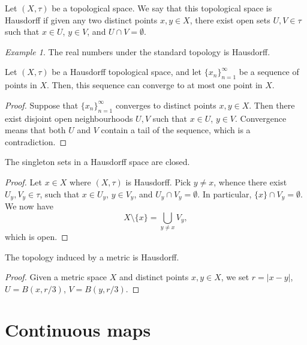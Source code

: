 \documentclass[11pt]{article}
\theoremstyle{definition}
\theoremstyle{remark}
\newtheorem*{example}{Example}
\numberwithin{equation}{section}
\begin{document}
    \begin{definition}
        Let $(X, \tau)$ be a topological space. We say that this topological space is
        Hausdorff if given any two distinct points $x, y \in X$, there exist open
        sets $U, V \in \tau$ such that $x \in U$, $y \in V$, and $U \cap V =
        \emptyset$.
    \end{definition}

    \begin{example}
        The real numbers under the standard topology is Hausdorff.
    \end{example}

    \begin{theorem}
        Let $(X, \tau)$ be a Hausdorff topological space, and let $\{x_n\}_{n =
        1}^\infty$ be a sequence of points in $X$. Then, this sequence can converge
        to at most one point in $X$.
    \end{theorem}
    \begin{proof}
        Suppose that $\{x_n\}_{n = 1}^\infty$ converges to distinct points $x, y \in
        X$. Then there exist disjoint open neighbourhoods $U, V$ such that $x \in U$,
        $y \in V$. Convergence means that both $U$ and $V$ contain a tail of the
        sequence, which is a contradiction.
    \end{proof}

    \begin{lemma}
        The singleton sets in a Hausdorff space are closed.
    \end{lemma}
    \begin{proof}
        Let $x \in X$ where $(X, \tau)$ is Hausdorff. Pick $y \neq x$, whence there
        exist $U_y, V_y \in \tau$, such that $x \in U_y$, $y \in V_y$, and $U_y \cap
        V_y = \emptyset$. In particular, $\{x\} \cap V_y = \emptyset$. We now have \[
            X\setminus \{x\} = \bigcup_{y \neq x} V_y,
        \] which is open.
    \end{proof}

    \begin{theorem}
        The topology induced by a metric is Hausdorff.
    \end{theorem}
    \begin{proof}
        Given a metric space $X$ and distinct points $x, y \in X$, we set $r = |x -
        y|$, $U = B(x, r/3)$, $V = B(y, r/3)$.
    \end{proof}
    

    \section{Continuous maps}
\end{document}
